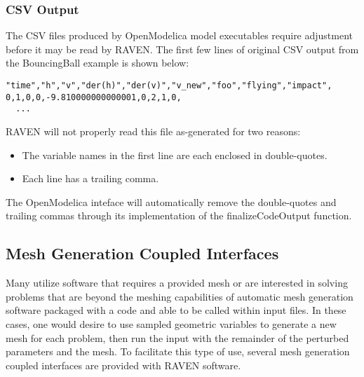 \subsubsection{CSV Output}
The CSV files produced by OpenModelica model executables require adjustment before it may be read by RAVEN. 
The first few lines of original CSV output from the 
BouncingBall example is shown below:
\begin{lstlisting}
"time","h","v","der(h)","der(v)","v_new","foo","flying","impact",
0,1,0,0,-9.810000000000001,0,2,1,0,
  ...
\end{lstlisting}
RAVEN will not properly read this file as-generated for two reasons:
\begin{itemize}
  \item The variable names in the first line are each enclosed in double-quotes. 
  \item Each line has a trailing comma.
\end{itemize}
 The OpenModelica inteface will automatically remove the double-quotes and trailing commas through its implementation of the 
finalizeCodeOutput function.  

\subsection{Mesh Generation Coupled Interfaces}
Many utilize software that requires a provided mesh or are interested in 
solving problems that are beyond the meshing capabilities of automatic 
mesh generation software packaged with a code and able to be called within 
input files.  In these cases, one would desire to use sampled geometric 
variables to generate a new mesh for each problem, then run the input with 
the remainder of the perturbed parameters and the mesh.  To facilitate this 
type of use, several mesh generation coupled interfaces are provided with 
RAVEN software.

